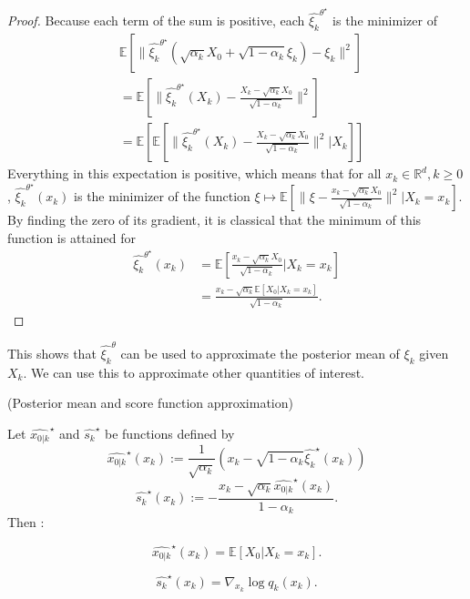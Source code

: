 \documentclass[12pt]{article}
\begin{document}
\begin{proof}
    Because each term of the sum is positive, each $\hat{\xi_k}^{\theta^\star}$ is the minimizer of
    \begin{align*}
    &\mathbb{E}\left[ \| 
    \hat{\xi_k}^{\theta^\star} (\sqrt{\alpha_k}X_0 + \sqrt{1 - \alpha_k} \xi_k) - \xi_k \|^2 \right] \\
    &= \mathbb{E}\left[ \| \hat{\xi_k}^{\theta^\star} (X_k) 
    - \frac{X_k - \sqrt{\alpha_k} X_0}{\sqrt{1 - \alpha_k}}\|^2 \right]\\
    &= \mathbb{E}\left[ \mathbb{E} \left[ \| \hat{\xi_k}^{\theta^\star} (X_k) 
    - \frac{X_k - \sqrt{\alpha_k} X_0}{\sqrt{1 - \alpha_k}} \|^2 | X_k \right] \right]
    \end{align*}
   Everything in this expectation is positive, which means that
   for all $x_k \in \mathbb{R}^d, k \geq 0$, $\hat{\xi_k}^{\theta^\star}(x_k)$
   is the minimizer of the function $\xi \mapsto \mathbb{E} \left[ \| \xi 
    - \frac{x_k - \sqrt{\alpha_k} X_0}{\sqrt{1 - \alpha_k}} \|^2 | X_k =x_k\right]$.
    By finding the zero of its gradient, it is classical 
    that the minimum of this function is attained for
    \begin{align*}
    \hat{\xi_k}^{\theta^\star} (x_k) 
    &= \mathbb{E} \left[ \frac{x_k - \sqrt{\alpha_k} X_0}{\sqrt{1 - \alpha_k}} | X_k = x_k \right]\\
    &= \frac{x_k - \sqrt{\alpha_k} \mathbb{E}[ X_0| X_k = x_k]}{\sqrt{1 - \alpha_k}}.
    \end{align*}
\end{proof}

This shows that $\hat{\xi_k}^\theta$ can be used to approximate the posterior mean of $\xi_k$ given $X_k$.
We can use this to approximate other quantities of interest.

\begin{assumption}(Posterior mean and score function approximation)
    \item Let $\hat{x_{0|k}}^\star$ and $\hat{s_k}^\star$ be functions defined by 
    $$\hat{x_{0|k}}^\star (x_k) := \frac{1}{\sqrt{\alpha_k}} \left( x_k - \sqrt{1 - \alpha_k} 
    \hat{\xi_k}^\star (x_k) \right)$$
    $$\hat{s_k}^\star (x_k) := -\frac{x_k - \sqrt{\alpha_k} \hat{x_{0|k}}^\star (x_k)}{1 - \alpha_k}.$$
    Then :
    \item \begin{equation}
    \hat{x_{0|k}}^\star (x_k) = \mathbb{E}[X_0 | X_k = x_k].
    \end{equation}
    \item \begin{equation}
    \hat{s_k}^\star (x_k) = \nabla_{x_k} \log q_k(x_k).
    \end{equation}
\end{assumption}
\end{document}
